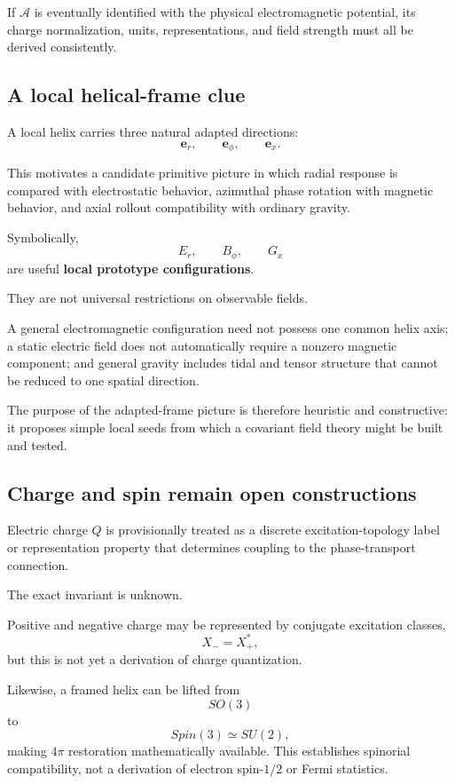 \documentclass[10pt]{article}
\begin{document}
If \(\mathcal A\) is eventually identified with the physical electromagnetic potential, its charge normalization, units, representations, and field strength must all be derived consistently.

\subsection{A local helical-frame clue}\label{a-local-helical-frame-clue}

A local helix carries three natural adapted directions: \[
\mathbf e_r,\qquad
\mathbf e_\phi,\qquad
\mathbf e_x.
\]

This motivates a candidate primitive picture in which radial response is compared with electrostatic behavior, azimuthal phase rotation with magnetic behavior, and axial rollout compatibility with ordinary gravity.

Symbolically, \[
E_r,\qquad B_\phi,\qquad G_x
\] are useful \textbf{local prototype configurations}.

They are not universal restrictions on observable fields.

A general electromagnetic configuration need not possess one common helix axis; a static electric field does not automatically require a nonzero magnetic component; and general gravity includes tidal and tensor structure that cannot be reduced to one spatial direction.

The purpose of the adapted-frame picture is therefore heuristic and constructive: it proposes simple local seeds from which a covariant field theory might be built and tested.

\subsection{Charge and spin remain open constructions}\label{charge-and-spin-remain-open-constructions}

Electric charge \(Q\) is provisionally treated as a discrete excitation-topology label or representation property that determines coupling to the phase-transport connection.

The exact invariant is unknown.

Positive and negative charge may be represented by conjugate excitation classes, \[
X_- = X_+^*,
\] but this is not yet a derivation of charge quantization.

Likewise, a framed helix can be lifted from \[
SO(3)
\] to \[
Spin(3)\simeq SU(2),
\] making \(4\pi\) restoration mathematically available. This establishes spinorial compatibility, not a derivation of electron spin-\(1/2\) or Fermi statistics.
\end{document}
